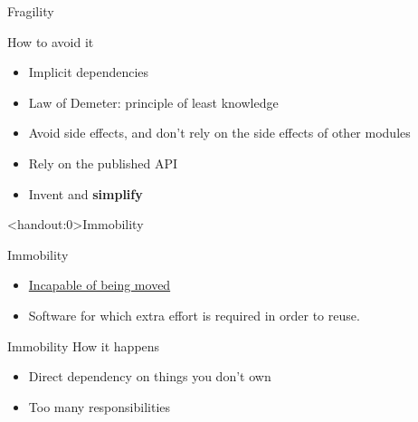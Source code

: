\documentclass[xcolor=svgnames]{beamer}
\begin{document}
{%
%
\begin{frame}{Fragility}

    How to avoid it
    \begin{itemize}
        \item<1-> Implicit dependencies
        \item<2-> Law of Demeter: principle of least knowledge
        \item<3-> Avoid side effects, and don't rely on the side effects of
            other modules
        \item<4-> Rely on the published API
        \item<5-> Invent and \textbf{simplify}
    \end{itemize}
\end{frame}
}


{%
%
\begin{frame}<handout:0>{Immobility}
\end{frame}
}

{%
%
\begin{frame}{Immobility}

    \begin{itemize}
        \item \href{https://www.merriam-webster.com/dictionary/immobile}
            {Incapable of being moved}
        \item<2-> Software for which extra effort is required in order to reuse.
    \end{itemize}
\end{frame}
}


{%
%
\begin{frame}{Immobility}
    How it happens
    \begin{itemize}
        \item<1-> Direct dependency on things you don't own
        \item<2-> Too many responsibilities
    \end{itemize}
\end{frame}
}
\end{document}
